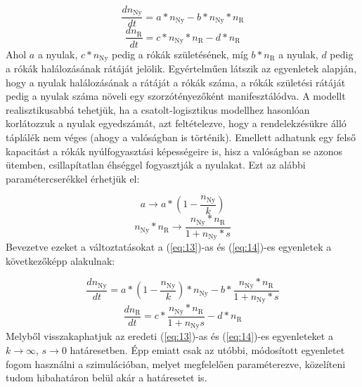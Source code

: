 \begin{multicols}{2}
\begin{equation} \label{eq:13}
    \frac{dn_{\text{Ny}}}{dt} = a * n_{\text{Ny}} - b * n_{\text{Ny}} * n_{\text{R}}
\end{equation}
\begin{equation} \label{eq:14}
    \frac{dn_{\text{R}}}{dt} = c * n_{\text{Ny}} * n_{\text{R}} - d * n_{\text{R}}
\end{equation}
Ahol $a$ a nyulak, $c * n_{\text{Ny}}$ pedig a rókák születésének, míg $b * n_{\text{R}}$ a nyulak, $d$ pedig a rókák halálozásának rátáját jelölik. Egyértelműen látszik az egyenletek alapján, hogy a nyulak halálozásának a rátáját a rókák száma, a rókák születési rátáját pedig a nyulak száma növeli egy szorzótényezőként manifesztálódva. A modellt realisztikusabbá tehetjük, ha a csatolt-logisztikus modellhez hasonlóan korlátozzuk a nyulak egyedszámát, azt feltételezve, hogy a rendelekzésükre álló táplálék nem véges (ahogy a valóságban is történik). Emellett adhatunk egy felső kapacitást a rókák nyúlfogyasztási képességeire is, hisz a valóságban se azonos ütemben, csillapítatlan éhséggel fogyasztják a nyulakat. Ezt az alábbi paramétercserékkel érhetjük el:

\begin{equation} \label{eq:15}
    a \to a * \left( 1 - \frac{n_{\text{Ny}}}{k} \right)
\end{equation}
\begin{equation} \label{eq:16}
    n_{\text{Ny}} * n_{\text{R}} \to \frac{n_{\text{Ny}} * n_{\text{R}}}{1 + n_{\text{Ny}} * s}
\end{equation}
Bevezetve ezeket a változtatásokat a (\ref{eq:13})-as és (\ref{eq:14})-es egyenletek a következőképp alakulnak:

\begin{equation} \label{eq:17}
    \frac{dn_{\text{Ny}}}{dt} = a * \left( 1 - \frac{n_{\text{Ny}}}{k} \right) * n_{\text{Ny}} - b * \frac{n_{\text{Ny}} * n_{\text{R}}}{1 + n_{\text{Ny}} * s}
\end{equation}
\begin{equation} \label{eq:18}
    \frac{dn_{\text{R}}}{dt} = c * \frac{n_{\text{Ny}} * n_{\text{R}}}{1 + n_{\text{Ny}} s} - d * n_{\text{R}}
\end{equation}
Melyből visszakaphatjuk az eredeti (\ref{eq:13})-as és (\ref{eq:14})-es egyenleteket a $k \to \infty$, $s \to 0$ határesetben. Épp emiatt csak az utóbbi, módosított egyenletet fogom használni a szimulációban, melyet megfelelően paraméterezve, közelíteni tudom hibahatáron belül akár a határesetet is.


\end{multicols}
